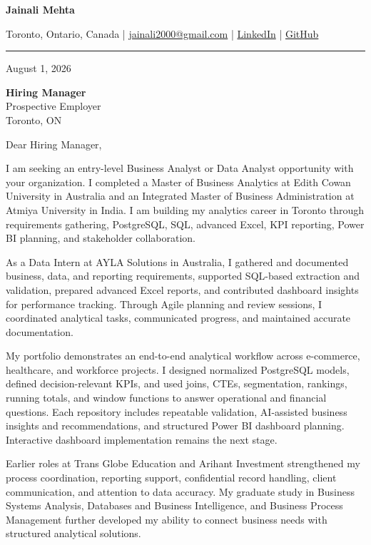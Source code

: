 \documentclass[letterpaper,10pt]{article}
\begin{document}
\begin{center}
  {\fontsize{17}{19}\selectfont\textbf{Jainali Mehta}}\par\vspace{2pt}
  \small Toronto, Ontario, Canada \;|\;
  \href{mailto:jainali2000@gmail.com}{jainali2000@gmail.com} \;|\;
  \href{https://www.linkedin.com/in/jainali-mehta}{LinkedIn} \;|\;
  \href{https://github.com/jainalimehta}{GitHub}
\end{center}
\vspace{-5pt}
\noindent\rule{\textwidth}{0.4pt}

August 1, 2026

\textbf{Hiring Manager}\\
Prospective Employer\\
Toronto, ON

Dear Hiring Manager,

I am seeking an entry-level Business Analyst or Data Analyst opportunity with your organization. I completed a Master of Business Analytics at Edith Cowan University in Australia and an Integrated Master of Business Administration at Atmiya University in India. I am building my analytics career in Toronto through requirements gathering, PostgreSQL, SQL, advanced Excel, KPI reporting, Power BI planning, and stakeholder collaboration.

As a Data Intern at AYLA Solutions in Australia, I gathered and documented business, data, and reporting requirements, supported SQL-based extraction and validation, prepared advanced Excel reports, and contributed dashboard insights for performance tracking. Through Agile planning and review sessions, I coordinated analytical tasks, communicated progress, and maintained accurate documentation.

My portfolio demonstrates an end-to-end analytical workflow across e-commerce, healthcare, and workforce projects. I designed normalized PostgreSQL models, defined decision-relevant KPIs, and used joins, CTEs, segmentation, rankings, running totals, and window functions to answer operational and financial questions. Each repository includes repeatable validation, AI-assisted business insights and recommendations, and structured Power BI dashboard planning. Interactive dashboard implementation remains the next stage.

Earlier roles at Trans Globe Education and Arihant Investment strengthened my process coordination, reporting support, confidential record handling, client communication, and attention to data accuracy. My graduate study in Business Systems Analysis, Databases and Business Intelligence, and Business Process Management further developed my ability to connect business needs with structured analytical solutions.
\end{document}
